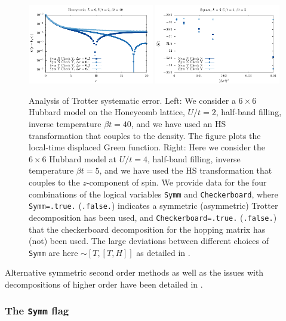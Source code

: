 \begin{figure}
\center
\includegraphics[width=0.49\textwidth]{Figures/Dtau_1/Dtau_1.pdf}
\includegraphics[width=0.49\textwidth]{Figures/Dtau/Dtau.pdf}

\caption{Analysis of  Trotter systematic error.
        Left:    We consider a $6 \times 6$ Hubbard model on the Honeycomb lattice, $U/t=2$, half-band filling,  inverse temperature $\beta t =40$,  and we have used an HS transformation that couples to  the density.    The figure plots the  local-time displaced Green function.
        Right: Here we consider the $6\times 6$ Hubbard model at $U/t=4$, half-band filling,  inverse temperature $\beta t =5$, and we have used the HS transformation that couples to the $z$-component of spin.  We provide data for the four combinations of  the logical variables \texttt{Symm}  and \texttt{Checkerboard}, where  \texttt{Symm=.true.}  (\texttt{.false.})  indicates a symmetric  (asymmetric) Trotter decomposition has been used, and  \texttt{Checkerboard=.true.}  (\texttt{.false.})   that the checkerboard decomposition for the hopping matrix has (not) been used.
        The large deviations between different choices of \texttt{Symm} are here $\sim [T, [T,H]]$ as detailed in \cite{goth2020}.
  }
        \label{Trotter.fig}
\end{figure}

Alternative symmetric second order methods as well as the issues with decompositions of higher order 
have been detailed in \cite{goth2020}.

\subsubsection{ The \texttt{Symm} flag } 

